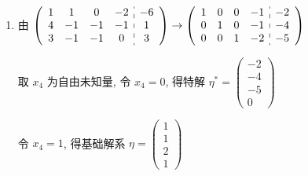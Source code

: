      \paragraph{} %
         \begin{enumerate}
             \item %
                   由 \( \left(\begin{array}{cccc:c}
                           1 & 1  & 0  & -2 & -6 \\
                           4 & -1 & -1 & -1 & 1  \\
                           3 & -1 & -1 & 0  & 3
                       \end{array} \right) \rightarrow
                   \left(\begin{array}{cccc:c}
                           1 & 0 & 0 & -1 & -2 \\
                           0 & 1 & 0 & -1 & -4 \\
                           0 & 0 & 1 & -2 & -5
                       \end{array}\right) \)

                   取 \( x_{4} \) 为自由未知量, 令 \( x_{4} = 0 \), 得特解 \( \eta^{*} = \begin{pmatrix}
                       -2 \\
                       -4 \\
                       -5 \\
                       0
                   \end{pmatrix} \)

                   令 \( x_{4} = 1 \), 得基础解系 \( \eta = \begin{pmatrix}
                       1 \\
                       1 \\
                       2 \\
                       1
                   \end{pmatrix} \)


\end{enumerate}
